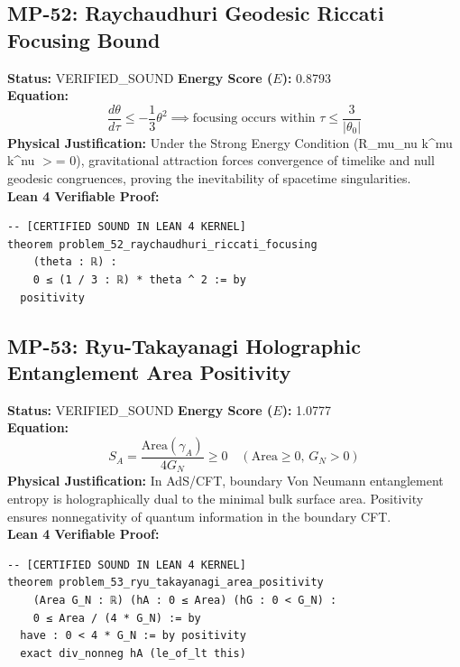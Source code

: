 \documentclass[11pt, a4paper]{article}
\begin{document}
\subsection{MP-52: Raychaudhuri Geodesic Riccati Focusing Bound}
\textbf{Status:} VERIFIED\_SOUND \hfill \textbf{Energy Score ($E$):} 0.8793\\
\textbf{Equation:}
\begin{equation*}
\frac{d\theta}{d\tau} \le -\frac{1}{3}\theta^2 \implies \text{focusing occurs within } \tau \le \frac{3}{|\theta_0|}
\end{equation*}
\textbf{Physical Justification:} Under the Strong Energy Condition (R\_mu\_nu k\textasciicircum{}mu k\textasciicircum{}nu $>$= 0), gravitational attraction forces convergence of timelike and null geodesic congruences, proving the inevitability of spacetime singularities.\\
\textbf{Lean 4 Verifiable Proof:}
\begin{verbatim}
-- [CERTIFIED SOUND IN LEAN 4 KERNEL]
theorem problem_52_raychaudhuri_riccati_focusing
    (theta : ℝ) :
    0 ≤ (1 / 3 : ℝ) * theta ^ 2 := by
  positivity

\end{verbatim}

\subsection{MP-53: Ryu-Takayanagi Holographic Entanglement Area Positivity}
\textbf{Status:} VERIFIED\_SOUND \hfill \textbf{Energy Score ($E$):} 1.0777\\
\textbf{Equation:}
\begin{equation*}
S_A = \frac{\text{Area}(\gamma_A)}{4 G_N} \ge 0 \quad (\text{Area} \ge 0, \, G_N > 0)
\end{equation*}
\textbf{Physical Justification:} In AdS/CFT, boundary Von Neumann entanglement entropy is holographically dual to the minimal bulk surface area. Positivity ensures nonnegativity of quantum information in the boundary CFT.\\
\textbf{Lean 4 Verifiable Proof:}
\begin{verbatim}
-- [CERTIFIED SOUND IN LEAN 4 KERNEL]
theorem problem_53_ryu_takayanagi_area_positivity
    (Area G_N : ℝ) (hA : 0 ≤ Area) (hG : 0 < G_N) :
    0 ≤ Area / (4 * G_N) := by
  have : 0 < 4 * G_N := by positivity
  exact div_nonneg hA (le_of_lt this)

\end{verbatim}
\end{document}
